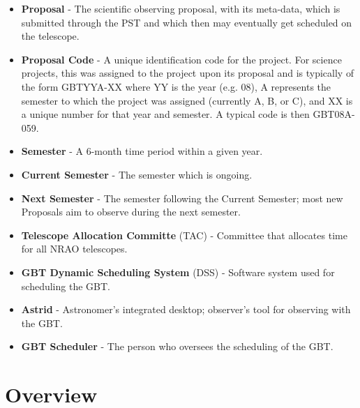 \documentclass{article}
\begin{document}
\begin{itemize}
\item {\bf Proposal} - The scientific observing proposal, with its meta-data, which is submitted through the PST and which then may
eventually get scheduled on the telescope. 
\item {\bf Proposal Code} -  A unique identification code for the project. For science projects, this was assigned to the
project upon its proposal and is typically of the form GBTYYA-XX where YY is the year (e.g. 08), A
represents the semester to which the project was assigned (currently A, B, or C), and XX is a unique
number for that year and semester. A typical code is then GBT08A-059.
\item {\bf Semester} - A 6-month time period within a given year.  
\item {\bf Current Semester} - The semester which is ongoing.
\item {\bf Next Semester} - The semester following the Current Semester; most new Proposals aim to observe during the next semester.
\item {\bf Telescope Allocation Committe} (TAC) - Committee that allocates time for all NRAO telescopes.
\item {\bf GBT Dynamic Scheduling System} (DSS) - Software system used for scheduling the GBT.
\item {\bf Astrid } - Astronomer's integrated desktop; observer's tool for observing with the GBT.
\item {\bf GBT Scheduler} - The person who oversees the scheduling of the GBT.
\end{itemize}

\section{Overview}
\end{document}
